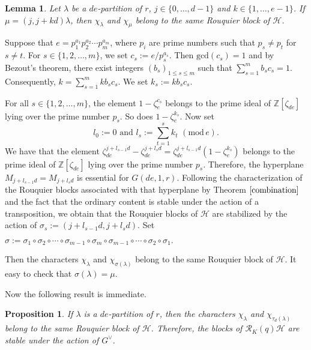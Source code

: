\documentclass[10pt,a4paper,titlepage]{article}
\newtheorem{lemma}[theorem]{Lemma}
\newtheorem{proposition}[theorem]{Proposition}
\newcommand{\el}{\lambda}
\begin{document}
\begin{lemma}\label{exchange}
Let $\el$  be a $de$-partition of $r$, $j \in \{0,\ldots,d-1\}$ and $k \in \{1,\ldots,e-1\}$.
If $\mu=(j,j+kd)\el$, then
$\chi_\el$ and $\chi_\mu$ belong to the same Rouquier block of $\mathcal{H}$.
\end{lemma}
\begin{apod}{Suppose that $e=p_1^{a_1}p_2^{a_2}\cdots p_m^{a_m}$, where $p_i$ are prime numbers such that
$p_s \neq p_t$ for $s \neq t$. For $s \in \{1,2,\ldots,m\}$, we set
$c_s:= e/p_s^{a_s}.$ Then $\mathrm{gcd}(c_s)=1$ and by Bezout's theorem, there exist integers $(b_s)_{1 \leq s \leq m}$ such that $\sum_{s=1}^mb_sc_s=1$. Consequently,
$k=\sum_{s=1}^mkb_sc_s.$ We set $k_s:=kb_sc_s.$

For all  $s \in \{1,2,\ldots,m\}$, the element $1-\zeta_e^{c_s}$ belongs to the prime ideal of $\mathbb{Z}[\zeta_{de}]$ lying over the prime number $p_s$. So does $1-\zeta_e^{k_s}$. Now set
 $$l_0:=0 \textrm{ and } l_s:=\sum_{t=1}^{s}k_t \,\,(\mathrm{ mod }\,e).$$
We have that the element $\zeta_{de}^{j+l_{s-1}d}-\zeta_{de}^{j+l_{s}d}=\zeta_{de}^{j+l_{s-1}d}(1-\zeta_{e}^{k_{s}})$ belongs to the prime ideal of $\mathbb{Z}[\zeta_{de}]$ lying over the prime number $p_s$.
Therefore, the hyperplane $M_{j+l_{s-1}d}=M_{j+l_sd}$ is essential for $G(de,1,r)$.
Following the characterization of the Rouquier blocks associated with that hyperplane 
by Theorem $\ref{combination}$ and the fact that 
the ordinary content is stable under the action of a transposition, we obtain that the Rouquier blocks of $\mathcal{H}$ are stabilized by the action of $\sigma_s:=(j+l_{s-1}d,j+l_{s}d)$.
Set \begin{center} $\sigma:= \sigma_1 \circ \sigma_2 \circ \cdots \circ \sigma_{m-1} \circ \sigma_m\circ \sigma_{m-1} \circ \cdots \circ \sigma_2 \circ \sigma_1.$\end{center}
Then the characters $\chi_\el$ and $\chi_{\sigma(\el)}$ belong to the same Rouquier block of $\mathcal{H}$. It easy to check that $\sigma(\el)=\mu$.}
\end{apod}

Now the following result is immediate.

\begin{proposition}\label{second step}
If $\el$ is a $de$-partition of $r$, then the characters $\chi_\el$ and $\chi_{\tau_d(\el)}$
 belong to the same Rouquier block of $\mathcal{H}$. Therefore, the blocks of $\mathcal{R}_K(q)\mathcal{H}$ are stable under the action of $G^\vee$.
\end{proposition}
\end{document}
